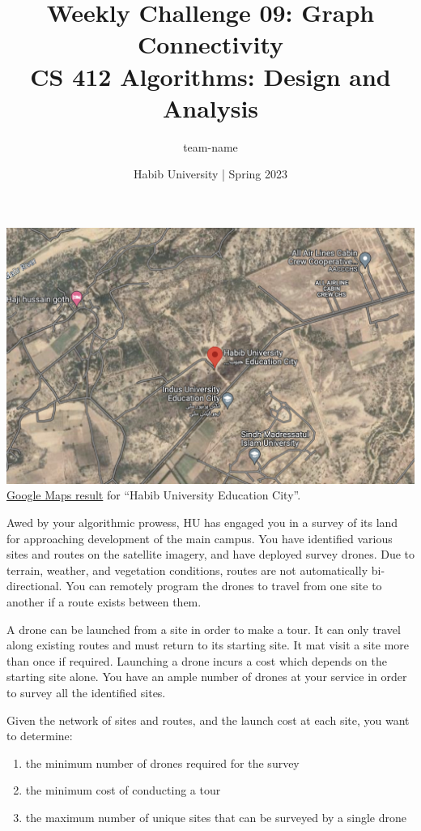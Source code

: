 \documentclass[a4paper]{exam}
\title{Weekly Challenge 09: Graph Connectivity\\CS 412 Algorithms: Design and Analysis}
\author{team-name}  %
\date{Habib University | Spring 2023}
\begin{document}
\maketitle

\begin{questions}



	\begin{center}
		\includegraphics[width=.7\textwidth]{campus}\\
		\small \href{https://www.google.com/maps/place/Habib+University+Education+City%E2%80%AD/@25.0000165,67.4035345,776m/data=!3m2!1e3!4b1!4m6!3m5!1s0x394cb5ab8da5ad77:0xd1101c614558c064!8m2!3d25.0000165!4d67.4035345!16s%2Fg%2F11hfg1fyvd?hl=en-PK}{Google Maps result} for ``Habib University Education City''.    
	\end{center}

	Awed by your algorithmic prowess, HU has engaged you in a survey of its land for approaching development of the main campus. You have identified various sites and routes on the satellite imagery, and have deployed survey drones. Due to terrain, weather, and vegetation conditions, routes are not automatically bi-directional. You can remotely program the drones to travel from one site to another if a route exists between them.

	A drone can be launched from a site in order to make a tour. It can only travel along existing routes and must return to its starting site. It mat visit a site more than once if required. Launching a drone incurs a cost which depends on the starting site alone. You have an ample number of drones at your service in order to survey all the identified sites.

	Given the network of sites and routes, and the launch cost at each site, you want to determine:
	\begin{enumerate}
		\item the minimum number of drones required for the survey
		\item the minimum cost of conducting a tour
		\item the maximum number of unique sites that can be surveyed by a single drone
	\end{enumerate}


\end{questions}
\end{document}
